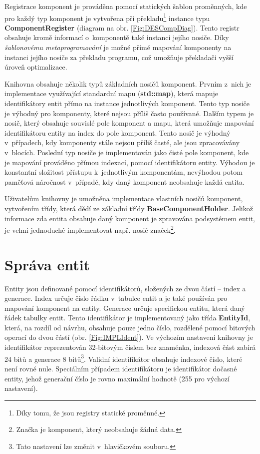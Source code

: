 Registrace komponent je prováděna pomocí statických šablon proměnných, kde pro každý typ komponent je vytvořena při překladu\footnote{Díky tomu, že jsou registry statické proměnné.} instance typu \textbf{ComponentRegister} (diagram na obr. \ref{Fig:DESCompDiag}). Tento registr obsahuje kromě informací o~komponentě také instanci jejího nosiče. Díky \emph{šablonovému metaprogramování} je možné přímé mapování komponenty na instanci jejího nosiče za překladu programu, což umožňuje překladači vyšší úroveň optimalizace.

Knihovna obsahuje několik typů základních nosičů komponent. Prvním z~nich je implementace využívající standardní mapu (\textbf{std::map}), která mapuje identifikátory entit přímo na instance jednotlivých komponent. Tento typ nosiče je výhodný pro komponenty, které nejsou příliš často používané. Dalším typem je nosič, který obsahuje souvislé pole komponent a mapu, která umožňuje mapování identifikátoru entity na index do pole komponent. Tento nosič je výhodný v~případech, kdy komponenty stále nejsou příliš časté, ale jsou zpracovávány v~blocích. Poslední typ nosiče je implementován jako čisté pole komponent, kde je mapování prováděno přímou indexací, pomocí identifikátoru entity. Výhodou je konstantní složitost přístupu k~jednotlivým komponentám, nevýhodou potom paměťová náročnost v~případě, kdy daný komponent neobsahuje každá entita. 

Uživatelům knihovny je umožněna implementace vlastních nosičů komponent, vytvořením třídy, která dědí ze základní třídy \textbf{BaseComponentHolder}. Jelikož informace zda entita obsahuje daný komponent je zpravována podsystémem entit, je velmi jednoduché implementovat např. nosič značek\footnote{Značka je komponent, který neobsahuje žádná data.}. 

\section{Správa entit}

Entity jsou definované pomocí identifikátorů, složených ze dvou částí -- index a generace. Index určuje číslo řádku v~tabulce entit a je také používán pro mapování komponent na entity. Generace určuje specifickou entitu, která  daný řádek tabulky entit. Tento identifikátor je implementovaný jako třída \textbf{EntityId}, která, na rozdíl od návrhu, obsahuje pouze jedno číslo, rozdělené pomocí bitových operací do dvou částí (obr. \ref{Fig:IMPLIdent}). Ve výchozím nastavení knihovny je identifikátor reprezentován 32-bitovým číslem bez znaménka, indexová část zabírá 24 bitů a generace 8 bitů\footnote{Tato nastavení lze změnit v~hlavičkovém souboru.}. Validní identifikátor obsahuje indexové číslo, které není rovné nule. Speciálním případem identifikátoru je identifikátor dočasné entity, jehož generační číslo je rovno maximální hodnotě (255 pro výchozí nastavení).

